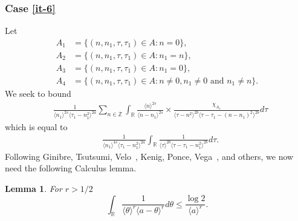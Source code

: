 \documentclass[12pt,reqno]{amsart}
\numberwithin{equation}{section}  %
\numberwithin{figure}{section}
\newcommand{\rr}{\mathbb{R}}
\newcommand{\zz}{\mathbb{Z}}
\theoremstyle{plain}
\newtheorem{lemma}{Lemma}
\theoremstyle{definition}
\theoremstyle{remark}
\begin{document}
 \subsubsection{Case \eqref{it-6}} 
\label{sssec:case-it-6}
Let 
%
%
\begin{align*}
A_1&=\{(n, n_1, \tau, \tau_1)\in A: n=0\},\\
A_2&=\{(n, n_1, \tau, \tau_1)\in A: n_1 = n \},\\
A_3&=\{(n, n_1, \tau, \tau_1)\in A: n_1=0 \},\\
A_4&=\{(n, n_1, \tau, \tau_1)\in A: n \neq 0, n_1 \neq 0 \text{ and } n_1 \neq n \}.
\end{align*} 
%
%
%
We seek to bound
\begin{equation*}
\begin{split}
  & \frac{1}{\langle n_{1} \rangle ^{2s}
  \langle \tau_{1} - n_{1}^{2} \rangle
  ^{2a}} \sum_{n \in \zz } \int_{\rr} \frac{\langle n \rangle ^{2s}}{\langle
  n - n_{1}\rangle ^{2s}}  \times \frac{\chi_{A_{1}}}{\langle
  \tau - n^{2}  \rangle ^{2b} \langle \tau - \tau_{1} - (n - n_{1})^{2}
  \rangle ^{2b}} d \tau 
\end{split}
\end{equation*}
which is equal to 
%
\begin{equation}
  \label{case-1-term-1-reduc}
\begin{split}
  & \frac{1}{\langle n_{1} \rangle ^{4s}
  \langle \tau_{1} - n_{1}^{2} \rangle
  ^{2a}} \int_{\rr} \frac{1}{\langle
  \tau  \rangle ^{2b} \langle \tau - \tau_{1} - n_{1}^{2}
  \rangle ^{2b}} d \tau.
\end{split}
\end{equation}
%
Following Ginibre, Tsutsumi, Velo~\cite{Ginibre:1997fk}, Kenig, Ponce, Vega~\cite{Kenig:1996aa}, and others,
we now need the following Calculus lemma.
%
%
%
%
%
%
%
\begin{lemma}
	\label{lem:calc}
 For $r > 1/2$
\begin{equation*}
  \int_{\rr} \frac{1} {\langle  \theta \rangle^{r} \langle  a - \theta
  \rangle^{r}} d \theta \leq\frac{\log 2} {\langle a \rangle^{r}}.
\end{equation*}
 \end{lemma}
\end{document}
